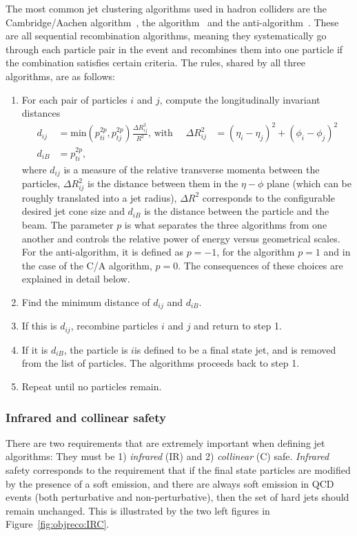 The most common jet clustering algorithms used in hadron colliders are the Cambridge/Aachen algorithm~\cite{Dokshitzer:1997in}, the \kt algorithm~\cite{Ellis:1993tq} and the anti-\kt algorithm~\cite{Cacciari:2008gp}. These are all sequential recombination algorithms, meaning they systematically go through each particle pair in the event and recombines them into one particle if the combination satisfies certain criteria. The rules, shared by all three algorithms, are as follows:
\begin{enumerate}
\item For each pair of particles $i$ and $j$, compute the longitudinally invariant distances
  \begin{align}  
  d_{ij} &= \textrm{min}(p_{ti}^{2p},p_{tj}^{2p})\frac{\Delta R^2_{ij}}{R^2} \textrm{, with } \quad \Delta R^2_{ij}&=(\eta_i - \eta_j)^2+(\phi_i - \phi_j)^2\\
  d_{iB} &= p_{ti}^{2p},
  \end{align}  
  where $d_{ij}$ is a measure of the relative transverse momenta between the particles, $\Delta R^2_{ij}$ is the distance between them in the $\eta-\phi$ plane (which can be roughly translated into a jet radius), $\Delta R^2$ corresponds to the configurable desired jet cone size and $d_{iB}$ is the distance between the particle and the beam. The parameter $p$ is what separates the three algorithms from one another and controls the relative power of energy versus geometrical
scales. For the anti-\kt algorithm, it is defined as $p=-1$, for the \kt algorithm $p=1$ and in the case of the C/A algorithm, $p=0$. The consequences of these choices are explained in detail below.
  \item Find the minimum distance of $d_{ij}$ and $d_{iB}$.
  \item If this is $d_{ij}$, recombine particles $i$ and $j$ and return to step 1.
  \item If it is $d_{iB}$, the particle is $i$is defined to be a final state jet, and is removed from the list of particles. The algorithms proceeds back to step 1.
  \item Repeat until no particles remain.
\end{enumerate}

\subsubsection{Infrared and collinear safety}
There are two requirements that are extremely important when defining jet algorithms: They must be 1) \textit{infrared} (IR) and 2) \textit{collinear} (C) safe.
\textit{Infrared} safety corresponds to the requirement that if the final state particles are modified by the presence of a soft emission, and there are always soft emission in QCD events (both perturbative and non-perturbative), then the set of hard jets should remain unchanged. This is illustrated by the two left figures in Figure~\ref{fig:objreco:IRC}.

